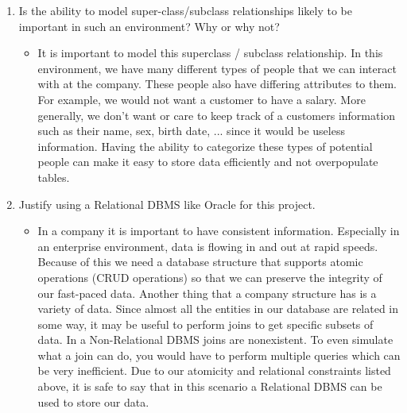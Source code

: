 \documentclass[12pt]{article}
\begin{document}
\begin{enumerate}
\begin{enumerate}
		\pagebreak
				
			\item Is the ability to model super-class/subclass relationships likely to be important in such an environment? Why or why not?
			\begin{itemize}
			\item It is important to model this superclass / subclass relationship. In this environment, we have many different types of people
      that we can interact with at the company. These people also have differing attributes to them. For example, we would not want
      a customer to have a salary. More generally, we don't want or care to keep track of a customers information such as their name,
      sex, birth date, ... since it would be useless information. Having the ability to categorize these types of potential people
      can make it easy to store data efficiently and not overpopulate tables.
			\end{itemize}
			
			\item Justify using a Relational DBMS like Oracle for this project.
				\begin{itemize}
					 \item In a company it is important to have consistent information. Especially in an enterprise environment, data is flowing in and out
      at rapid speeds. Because of this we need a database structure that supports atomic operations (CRUD operations) so that we can
      preserve the integrity of our fast-paced data. Another thing that a company structure has is a variety of data. Since almost all
      the entities in our database are related in some way, it may be useful to perform joins to get specific subsets of data. In a
      Non-Relational DBMS joins are nonexistent. To even simulate what a join can do, you would have to perform multiple queries which
      can be very inefficient. Due to our atomicity and relational constraints listed above, it is safe to say that in this scenario a
      Relational DBMS can be used to store our data.
				\end{itemize}			
		\end{enumerate}
		
		\pagebreak
		

\end{enumerate}
\end{document}
